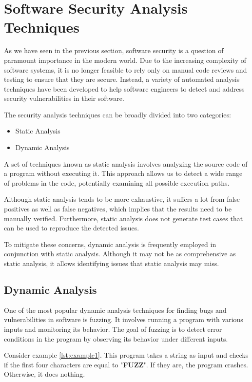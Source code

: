 \section{Software Security Analysis Techniques}

As we have seen in the previous section, software security is a question of paramount importance in the modern world. Due to the increasing complexity of software systems, it is no longer feasible to rely only on manual code reviews and testing to ensure that they are secure. Instead, a variety of automated analysis techniques have been developed to help software engineers to detect and address security vulnerabilities in their software.

The security analysis techniques can be broadly divided into two categories:

\begin{itemize}
	\item Static Analysis
	\item Dynamic Analysis
\end{itemize}

A set of techniques known as static analysis involves analyzing the source code of a program without executing it. This approach allows us to detect a wide range of problems in the code, potentially examining all possible execution paths.

Although static analysis tends to be more exhaustive, it suffers a lot from false positives as well as false negatives, which implies that the results need to be manually verified. Furthermore, static analysis does not generate test cases that can be used to reproduce the detected issues.

To mitigate these concerns, dynamic analysis is frequently employed in conjunction with static analysis. Although it may not be as comprehensive as static analysis, it allows identifying issues that static analysis may miss.

\subsection{Dynamic Analysis}

One of the most popular dynamic analysis techniques for finding bugs and vulnerabilities in software is fuzzing. It involves running a program with various inputs and monitoring its behavior. The goal of fuzzing is to detect error conditions in the program by observing its behavior under different inputs.

Consider example \ref{lst:example1}. This program takes a string as input and checks if the first four characters are equal to "\textbf{FUZZ}". If they are, the program crashes. Otherwise, it does nothing.

